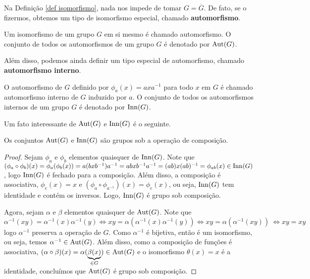 	Na Definição \ref{def isomorfismo}, nada nos
	impede de tomar $G = \overline{G}$. De fato, se o fizermos, obtemos
	um tipo de isomorfismo especial, chamado {\bf automorfismo}.
	\begin{definition}[Autormorfismo]
	\label{def automorfismo}
		Um isomorfismo de um grupo $G$ em si mesmo é chamado 
		automorfismo. O conjunto de todos os automorfismos de um 
		grupo $G$ é denotado por $\operatorname{Aut}(G)$.
	\end{definition}
	Além disso, podemos ainda definir um tipo 
	especial de automorfismo, chamado {\bf automorfismo interno}.
	\begin{definition}
	\label{def automorfismo interno}
		O automorfismo de $G$ definido por $\phi_a(x) = axa^{-1}$ 
		para todo $x$ em $G$ é chamado automorfismo interno de $G$
		induzido por $a$. O conjunto de todos os automorfismos
		internos de um grupo $G$ é denotado por $\operatorname{Inn}(G)$.
	\end{definition}
	Um fato interessante de $\operatorname{Aut}(G)$ e $\operatorname{Inn}(G)$ 
	é o seguinte.
	\begin{theorem}
		Os conjuntos $\operatorname{Aut}(G)$ e $\operatorname{Inn}(G)$ são grupos sob a operação de composição.
	\end{theorem}
	\begin{proof}
		Sejam $\phi_a$ e $\phi_b$ elementos quaisquer de $\operatorname{Inn}(G)$. 
		Note que $(\phi_a\circ\phi_b)(x) = \phi_a(\phi_b(x)) 
		= a(bxb^{-1})a^{-1} = abxb^{-1}a^{-1} = (ab)x(ab)^{-1} 
		= \phi_{ab}(x) \in \operatorname{Inn}(G)$, logo $\operatorname{Inn}(G)$ é fechado para a
		composição. Além disso, a composição é associativa, 
		$\phi_e(x) = x$ e $(\phi_a\circ\phi_{a^{-1}})(x) = \phi_e(x)$, 
		ou seja, $\operatorname{Inn}(G)$ tem identidade e contém os inversos. 
		Logo, $\operatorname{Inn}(G)$ é grupo sob composição.
		\vspace{0.3cm}\par Agora, sejam $\alpha$ e $\beta$ elementos
		quaisquer de $\operatorname{Aut}(G)$. Note que
		\begin{equation*}
		    \alpha^{-1}(xy) = \alpha^{-1}(x)\alpha^{-1}(y) 
		    \iff xy = \alpha(\alpha^{-1}(x)\alpha^{-1}(y)) 
		    \iff xy = \alpha(\alpha^{-1}(xy))\ \iff xy = xy
		\end{equation*}
		logo $\alpha^{-1}$ preserva a operação de $G$. 
		Como $\alpha^{-1}$ é bijetiva, então é um isomorfismo, ou seja,
		temos $\alpha^{-1}\in \operatorname{Aut}(G)$. Além disso, como a composição
		de funções é associativa, $(\alpha\circ\beta)(x) 
		= \alpha(\underbrace{\beta(x)}_{\in G}) \in \operatorname{Aut}(G)$ e o
		isomorfismo $\theta(x) = x$ é a identidade, concluímos que
		$\operatorname{Aut}(G)$ é grupo sob composição.
	\end{proof}
